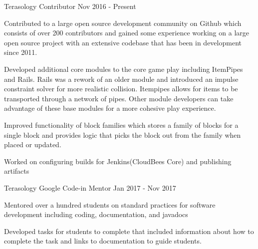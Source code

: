 \begin{cventries}
  \cventry
    {Terasology} %
    {Contributor} %
    {} %
    { Nov 2016 - Present} %
    {
      \begin{cvitems} %
        \item{Contributed to a large open source development community on Github which consists of over 200 contributors and gained some experience working on a large open source project with an extensive codebase that has been in development since 2011.}
        \item{Developed additional core modules to the core game play including ItemPipes and Rails. Rails was a rework of an older module and introduced an impulse constraint solver for more realistic collision. Itempipes allows for items to be transported through a network of pipes. Other module developers can take advantage of these base modules for a more cohesive play experience. }
        \item{Improved functionality of block families which stores a family of blocks for a single block and provides logic that picks the block out from the family when placed or updated.}
        \item{Worked on configuring builds for Jenkins(CloudBees Core) and publishing artifacts }
      \end{cvitems}
    }
    
  \cventry
    {Terasology} %
    {Google Code-in Mentor} %
    {} %
    { Jan 2017 - Nov 2017} %
    {
      \begin{cvitems} %
        \item{Mentored over a hundred students on standard practices for software development including coding, documentation, and javadocs}
        \item {Developed tasks for students to complete that included information about how to complete the task and links to documentation to guide students. }
      \end{cvitems}
    }
    


\end{cventries}
